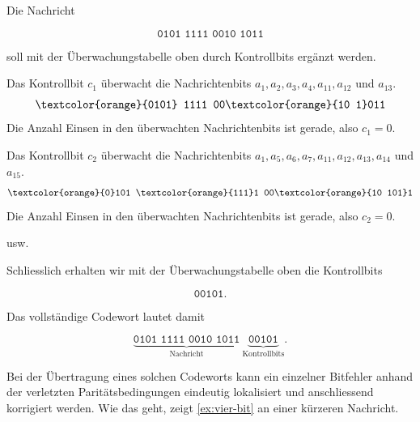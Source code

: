 \begin{myexample}
    Die Nachricht

    \[
        \texttt{0101 1111 0010 1011}
    \]

    soll mit der Überwachungstabelle oben durch Kontrollbits ergänzt werden.

    Das Kontrollbit \(c_1\) überwacht die Nachrichtenbits \(a_1, a_2, a_3, a_4, a_{11}, a_{12}\) und \(a_{13}\).
    \[
        \texttt{\textcolor{orange}{0101} 1111 00\textcolor{orange}{10 1}011}
    \]
    Die Anzahl Einsen in den überwachten Nachrichtenbits ist gerade, also \(c_1 = 0\).


    Das Kontrollbit \(c_2\) überwacht die Nachrichtenbits \(a_1, a_5, a_6, a_7, a_{11}, a_{12}, a_{13}, a_{14}\) und \(a_{15}\).
    \[
        \texttt{\textcolor{orange}{0}101 \textcolor{orange}{111}1 00\textcolor{orange}{10 101}1}
    \]
    Die Anzahl Einsen in den überwachten Nachrichtenbits ist gerade, also \(c_2 = 0\).

    usw.

    Schliesslich erhalten wir mit der Überwachungstabelle oben
    die Kontrollbits

    \[
        \texttt{00101}.
    \]

    Das vollständige Codewort lautet damit

    \[
        \underbrace{\texttt{0101 1111 0010 1011}}_{\text{Nachricht}}
        \ \underbrace{\texttt{00101}}_{\text{Kontrollbits}}.
    \]

    Bei der Übertragung eines solchen Codeworts kann ein einzelner
    Bitfehler anhand der verletzten Paritätsbedingungen eindeutig
    lokalisiert und anschliessend korrigiert werden. Wie das geht,
    zeigt \cref{ex:vier-bit} an einer kürzeren Nachricht.
\end{myexample}

